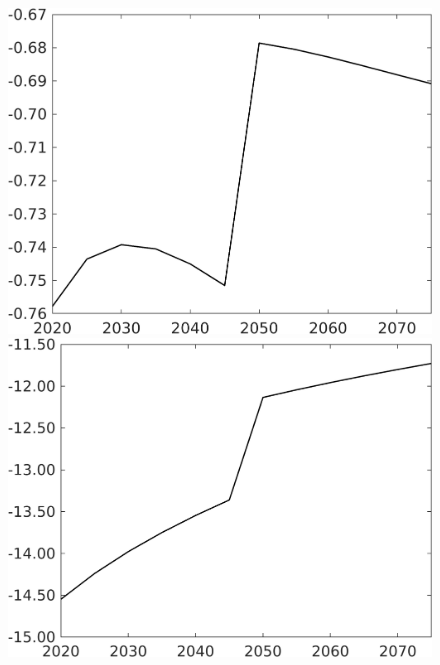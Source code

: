 \documentclass[12pt]{article}
\begin{document}
\begin{figure}[h!!]
\begin{minipage}[]{0.32\textwidth}
\end{minipage}	
\begin{minipage}[]{0.32\textwidth}
\includegraphics[width=1\textwidth]{../../codding_model/own_basedOnFried/optimalPol_010922_revision/figures/all_13Sept22/CompTaufPER_bytaul_Reg0_Lf_spillover0_nsk0_xgr0_knspil0_sep1_LFlimit1_emsbase0_countec0_GovRev0_etaa0.79_lgd0.png}
\end{minipage}		
\begin{minipage}[]{0.32\textwidth}
\includegraphics[width=1\textwidth]{../../codding_model/own_basedOnFried/optimalPol_010922_revision/figures/all_13Sept22/CompTaufPER_bytaul_Reg0_Lg_spillover0_nsk0_xgr0_knspil0_sep1_LFlimit1_emsbase0_countec0_GovRev0_etaa0.79_lgd0.png}

\end{minipage}
\end{figure}
\end{document}
